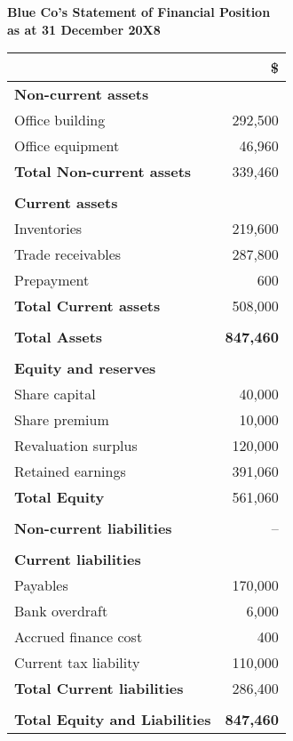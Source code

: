 \begin{center}
\textbf{Blue Co’s Statement of Financial Position}\\
\textbf{as at 31 December 20X8}
\end{center}

\begin{tabular}{@{}p{8cm}r@{}}
\toprule
 & \textbf{\$} \\
\midrule
\textbf{Non-current assets} & \\
\quad Office building & 292,500 \\
\quad Office equipment & 46,960 \\
\textbf{Total Non-current assets} & 339,460 \\
\\
\textbf{Current assets} & \\
\quad Inventories & 219,600 \\
\quad Trade receivables & 287,800 \\
\quad Prepayment & 600 \\
\textbf{Total Current assets} & 508,000 \\
\\
\textbf{Total Assets} & \textbf{847,460} \\
\\
\textbf{Equity and reserves} & \\
\quad Share capital & 40,000 \\
\quad Share premium & 10,000 \\
\quad Revaluation surplus & 120,000 \\
\quad Retained earnings & 391,060 \\
\textbf{Total Equity} & 561,060 \\
\\
\textbf{Non-current liabilities} & -- \\
\\
\textbf{Current liabilities} & \\
\quad Payables & 170,000 \\
\quad Bank overdraft & 6,000 \\
\quad Accrued finance cost & 400 \\
\quad Current tax liability & 110,000 \\
\textbf{Total Current liabilities} & 286,400 \\
\\
\textbf{Total Equity and Liabilities} & \textbf{847,460} \\
\bottomrule
\end{tabular}
